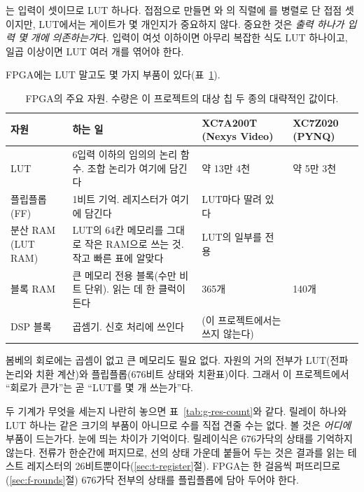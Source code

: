 \General {}는 입력이 셋이므로 LUT 하나다. 접점으로 만들면 와 의 직렬에
를 병렬로 단 접점 셋이지만, LUT에서는 게이트가 몇 개인지가 중요하지 않다.
중요한 것은 \emph{출력 하나가 입력 몇 개에 의존하는가}다. 입력이 여섯 이하이면 아무리 복잡한 식도
LUT 하나이고, 일곱 이상이면 LUT 여러 개를 엮어야 한다.

FPGA에는 LUT 말고도 몇 가지 부품이 있다(표~\ref{tab:g-res}).

\begin{table}[ht]
\centering
\caption{FPGA의 주요 자원. 수량은 이 프로젝트의 대상 칩 두 종의 대략적인 값이다.}
\label{tab:g-res}
\small
\begin{tabularx}{\linewidth}{l>{\raggedright\arraybackslash}X>{\raggedright\arraybackslash}p{27mm}>{\raggedright\arraybackslash}p{24mm}}
\toprule
자원 & 하는 일 & XC7A200T (Nexys Video) & XC7Z020 (PYNQ) \\
\midrule
LUT & 6입력 이하의 임의의 논리 함수. 조합 논리가 여기에 담긴다 & 약 13만 4천 & 약 5만 3천 \\
플립플롭(FF) & 1비트 기억. 레지스터가 여기에 담긴다 & LUT마다 딸려 있다 & \\
분산 RAM (LUT RAM) & LUT의 64칸 메모리를 그대로 작은 RAM으로 쓰는 것. 작고 빠른 표에 알맞다 & LUT의 일부를 전용 & \\
블록 RAM & 큰 메모리 전용 블록(수만 비트 단위). 읽는 데 한 클럭이 든다 & 365개 & 140개 \\
DSP 블록 & 곱셈기. 신호 처리에 쓰인다 & (이 프로젝트에서는 쓰지 않는다) & \\
\bottomrule
\end{tabularx}
\end{table}

\Ours 봄베의 회로에는 곱셈이 없고 큰 메모리도 필요 없다. 자원의 거의 전부가 LUT(전파 논리와 치환 계산)와
플립플롭(676비트 상태와 치환표)이다. 그래서 이 프로젝트에서 ``회로가 큰가''는 곧 ``LUT를 몇 개 쓰는가''다.

두 기계가 무엇을 세는지 나란히 놓으면 표~\ref{tab:g-res-count}와 같다. 릴레이 하나와 LUT 하나는 같은 크기의
부품이 아니므로 수를 직접 견줄 수는 없다. 볼 것은 \emph{어디에} 부품이 드는가다. 눈에 띄는 차이가 기억이다.
릴레이식은 676가닥의 상태를 기억하지 않는다. 전류가 한순간에 퍼지므로, 선의 상태 가운데 붙들어 두는 것은
결과를 읽는 테스트 레지스터의 26비트뿐이다(\ref{sec:t-register}절). FPGA는 한 걸음씩 퍼뜨리므로(\ref{sec:f-rounds}절) 676가닥 전부의 상태를
플립플롭에 담아 두어야 한다.

